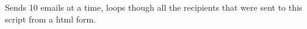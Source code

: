 \-Sends 10 emails at a time, loops though all the recipients that were sent to this script from a html form. \hypertarget{sendMail_8php_a3ad3a4240c0f97c7e85aff5c52a454d4}{
\subsubsection[{print}]{}}\label{sendMail_8php_a3ad3a4240c0f97c7e85aff5c52a454d4}
